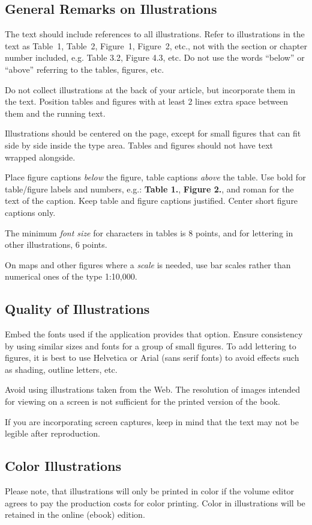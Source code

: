 \documentclass{IOS-Book-Article}
\begin{document}
\subsection{General Remarks on Illustrations}
The text should include references to all illustrations. Refer to illustrations in the
text as Table~1, Table~2, Figure~1, Figure~2, etc., not with the section or chapter number
included, e.g. Table 3.2, Figure 4.3, etc. Do not use the words ``below'' or ``above''
referring to the tables, figures, etc.

Do not collect illustrations at the back of your article, but incorporate them in the
text. Position tables and figures with at least 2 lines
extra space between them and the running text.

Illustrations should be centered on the page, except for small figures that can fit
side by side inside the type area. Tables and figures should not have text wrapped
alongside.

Place figure captions \textit{below} the figure, table captions \textit{above} the table.
Use bold for table/figure labels and numbers, e.g.: \textbf{Table 1.}, \textbf{Figure 2.},
and roman for the text of the caption. Keep table and figure captions justified. Center
short figure captions only.

The minimum \textit{font size} for characters in tables is 8 points, and for lettering in other
illustrations, 6 points.

On maps and other figures where a \textit{scale} is needed, use bar scales rather than
numerical ones of the type 1:10,000.

\subsection{Quality of Illustrations}
Embed the fonts used if the application provides that option.
Ensure consistency by using similar sizes and fonts for a group of small figures.
To add lettering to figures, it is best to use Helvetica or Arial (sans serif fonts)
to avoid effects such as shading, outline letters, etc.

 Avoid using illustrations
taken from the Web. The resolution of images intended for viewing on a screen is
not sufficient for the printed version of the book.

If you are incorporating screen captures, keep in mind that the text may not be
legible after reproduction.

\subsection{Color Illustrations}
Please note, that illustrations will only be printed in color if the volume editor agrees to
pay the production costs for color printing. Color in illustrations will be retained
in the online (ebook) edition.
\end{document}
